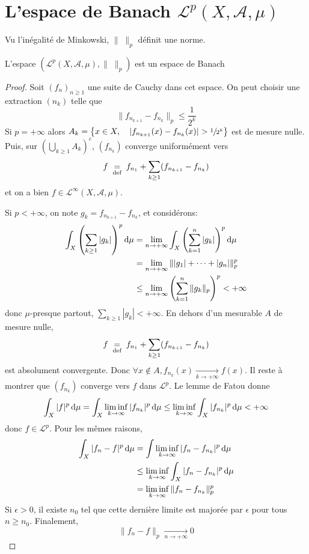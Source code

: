 \section{L'espace de Banach \texorpdfstring{$\mathcal  L^p(X, \mathcal  A, \mu)$}{L^p(X,A,mu)}}

\begin{rem}
Vu l'inégalité de Minkowski, $\|\;\|_p$ définit une norme.
\end{rem}

\begin{thm}[Riesz]
    L'espace $(\mathcal L^p(X, \mathcal  A, \mu), \|\;\|_p)$ est un espace de Banach
\end{thm}

\begin{proof}
    Soit $(f_n)_{n\geq 1}$ une suite de Cauchy dans cet espace. On peut choisir une extraction $(n_k)$ telle que  \[
        \|f_{n_{k+1}}-f_{n_k}\|_p\leq \frac1{2^k}
    \]
    Si $p=+\infty$ alors  $A_k= \left\{ x \in  X, \quad  |f_{n_{k+1}}(x)-f_{n_k}(x)|>\sfrac1{2^k} \right\} $ est de mesure nulle. Puis, sur $(\bigcup_{k\geq 1}A_k)^c$, $(f_{n_k})$ converge uniformément vers \[f\;\underset{\text{def}}=\; f_{n_1}+\sum_{k\geq 1}(f_{n_{k+1}}-f_{n_k})\] et on a bien  $f \in  \mathcal  L^\infty(X, \mathcal A, \mu)$.

    Si $p<+\infty$, on note $g_k=f_{n_{k+1}}-f_{n_k}$, et considérons:
    \begin{align*} \int_X\left( \sum_{k\geq1}|g_k|\right)^p\mathop{}\!\mathrm d\mu &=\lim_{n\to +\infty}\int_X\left( \sum_{k=1}^n|g_k|\right)^p\mathop{}\!\mathrm d\mu \\&= \lim_{n\to +\infty}\||g_1|+\dots +|g_n|\|_p^p \\&\leq \lim_{n\to +\infty}\left( \sum_{k=1}^n \|g_k\|_p\right)^p<+\infty \end{align*}
donc $\mu$-presque partout, $\sum_{k\geq 1}|g_k|<+\infty$.
En dehors d'un mesurable $A$ de mesure nulle, \[ f\;\underset{\text{def}}=\; f_{n_1}+\sum_{k\geq 1}(f_{n_{k+1}}-f_{n_k})\]
est absolument convergente. Donc $\forall x\notin A, f_{n_k}(x) \xrightarrow[k\to+\infty ]{} f(x)$. Il reste à montrer que $(f_{n_{k}})$ converge vers $f$ dans  $ \mathcal  L^p$. Le lemme de Fatou donne \[
\int_X|f|^p\mathop{}\!\mathrm d\mu =\int_X \liminf_{k\to \infty}|f_{n_k}|^p\mathop{}\!\mathrm d\mu \leq \liminf_{k\to \infty}\int_X|f_{n_k}|^p\mathop{}\!\mathrm d\mu <+\infty
\] 
donc $f \in  \mathcal  L^p$. Pour les mêmes raisons, \begin{align*}
\int_X|f_n-f|^p\mathop{}\!\mathrm d\mu &= \int \liminf_{k\to\infty}|f_n-f_{n_k}|^p\mathop{}\!\mathrm d\mu \\
&\leq \liminf_{k\to \infty}\int_X |f_n-f_{n_k}|^p\mathop{}\!\mathrm d\mu \\
&= \liminf_{k\to\infty}\|f_n-f_{n_k}\|_p^p
\end{align*}
Si $\epsilon>0$, il existe $n_0$ tel que cette dernière limite est majorée par  $\epsilon$ pour tous $n\geq n_0$. Finalement, \[
\|f_n-f\|_p \xrightarrow[n\to+\infty]{}0
\] 
\end{proof}

